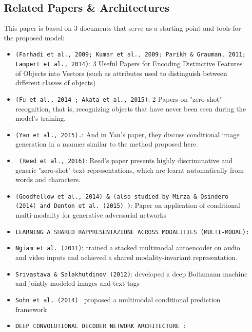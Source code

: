  \subsection*{Related Papers \& Architectures}
 This paper is based on 3 documents that serve as a starting 
 point and tools for the proposed model:
 \begin{itemize}[noitemsep]
    \item \texttt{(Farhadi et al., 2009; Kumar et al., 2009;
    Parikh \& Grauman, 2011; Lampert et al., 2014)}: 
    3 Useful Papers for Encoding Distinctive Features of Objects 
    into Vectors (such as attributes used to distinguish 
    between different classes of objects)
    \item \texttt{(Fu et al., 2014 ; Akata et al., 2015)}: 
    2 Papers on "zero-shot" recognition, that is, recognizing 
    objects that have never been seen during the model's training.
    \item \texttt{(Yan et al., 2015).}: 
    And in Yan's paper, they discuss conditional image generation 
    in a manner similar to the method proposed here.
    \item \texttt{ (Reed et al., 2016)}: 
    Reed's paper presents highly discriminative and generic
    "zero-shot" text representations, 
    which are learnt automatically from words and characters.
    \item \texttt{(Goodfellow et al., 2014) \& (also studied
    by Mirza \& Osindero (2014) and Denton et al. (2015) )}: 
    Paper on application of conditional multi-modality for generative adversarial networks 

    \item \texttt{LEARNING A SHARED RAPPRESENTAZIONE ACROSS MODALITIES (MULTI-MODAL):}

    \item \texttt{Ngiam et al. (2011)}: 
    trained a stacked multimodal autoencoder on audio and video inputs and achieved a shared 
    modality-invariant representation.

    \item \texttt{Srivastava \& Salakhutdinov (2012)}: 
    developed a deep Boltzmann machine and jointly modeled images and text tags

    \item \texttt{Sohn et al. (2014) }
    proposed a multimodal conditional prediction framework

    \item \texttt{DEEP CONVOLUTIONAL DECODER NETWORK ARCHITECTURE :}
    

\end{itemize}
